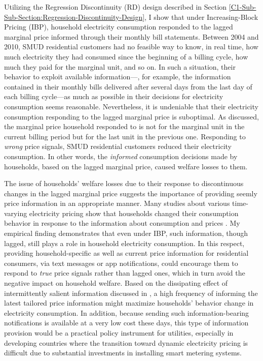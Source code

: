 Utilizing the Regression Discontinuity (RD) design described in Section \ref{C1-Sub-Sub-Section:Regression-Discontinuity-Design}, I show that under Increasing-Block Pricing (IBP), household electricity consumption responded to the lagged marginal price informed through their monthly bill statements. Between 2004 and 2010, SMUD residential customers had no feasible way to know, in real time, how much electricity they had consumed since the beginning of a billing cycle, how much they paid for the marginal unit, and so on. In such a situation, their behavior to exploit available information---, for example, the information contained in their monthly bills delivered after several days from the last day of each billing cycle---as much as possible in their decisions for electricity consumption seems reasonable. Nevertheless, it is undeniable that their electricity consumption responding to the lagged marginal price is suboptimal. As discussed, the marginal price household responded to is not for the marginal unit in the current billing period but for the last unit in the previous one. Responding to \textit{wrong} price signals, SMUD residential customers reduced their electricity consumption. In other words, the \textit{informed} consumption decisions made by households, based on the lagged marginal price, caused welfare losses to them. 

The issue of households' welfare losses due to their response to discontinuous changes in the lagged marginal price suggests the importance of providing seemly price information in an appropriate manner. Many studies about various time-varying electricity pricing show that households changed their consumption behavior in response to the information about consumption and prices \citep{Dynamic-Pricing-of-Electricity-in-the-Mid-Atlantic-Region_Econometric-Results-from-the-Baltimore-Gas-and-Electric-Company-Experiment_Faruqui-et-al_2011, Knowledge-is-Less-Power_Jessoe-and-Rapson_2014, The-Effect-of-Information-on-TOU-Electricity-Use:An-Irish-Residential-Study_Pon_2017, Information-vs-Automation-and-Implications-for-Dynamic-Pricing_Bollinger-and-Hartmann_2020}. My empirical finding demonstrates that even under IBP, such information, though lagged, still plays a role in household electricity consumption. In this respect, providing household-specific as well as current price information for residential consumers, via text messages or app notifications, could encourage them to respond to \textit{true} price signals rather than lagged ones, which in turn avoid the negative impact on household welfare. Based on the dissipating effect of intermittently salient information discussed in \cite{Dynamic-Salience-with-Intermittent-Billing_Gilbert-and-Zivin_2014}, a high frequency of informing the latest tailored price information might maximize households' behavior change in electricity consumption. In addition, because sending such information-bearing notifications is available at a very low cost these days, this type of information provision would be a practical policy instrument for utilities, especially in developing countries where the transition toward dynamic electricity pricing is difficult due to substantial investments in installing smart metering systems. 

